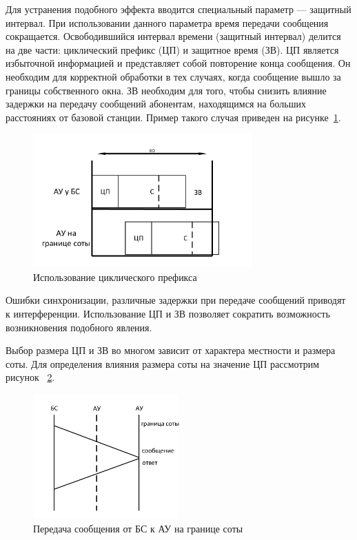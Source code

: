 Для устранения подобного эффекта вводится специальный параметр --- защитный интервал.
При использовании данного параметра время передачи сообщения сокращается. Освободившийся интервал
времени (защитный интервал) делится на две части: циклический префикс (ЦП) и защитное время (ЗВ).
ЦП является избыточной информацией и представляет собой повторение конца сообщения.
Он необходим для корректной обработки в тех случаях, когда сообщение вышло за границы
собственного окна. ЗВ необходим для того, чтобы снизить влияние задержки на передачу сообщений
абонентам, находящимся на больших расстояниях от базовой станции. Пример такого случая
приведен на рисунке~\ref{fig:vol_CP}. 
\begin{figure}[H]
    \centering
    \includegraphics[width=0.75\textwidth]{img/vol_CP}
    \caption{Использование циклического префикса}
    \label{fig:vol_CP}
\end{figure}

Ошибки синхронизации, различные задержки при передаче сообщений приводят к интерференции.
Использование ЦП и ЗВ позволяет сократить возможность возникновения подобного явления.

Выбор размера ЦП и ЗВ во многом зависит от характера местности и размера соты. Для определения влияния размера соты на значение ЦП рассмотрим рисунок 
~\ref{fig:vol_calc_CP}.
\begin{figure}[H]
    \centering
    \includegraphics[width=0.5\textwidth]{img/vol_calc_CP}
    \caption{Передача сообщения от БС к АУ на границе соты}
    \label{fig:vol_calc_CP}
\end{figure}

